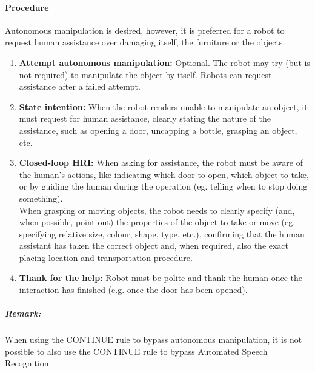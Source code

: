\paragraph{Procedure}
Autonomous manipulation is desired, however, it is preferred for a robot to request human assistance over damaging itself, the furniture or the objects.
\begin{enumerate}
	\item \textbf{Attempt autonomous manipulation:} Optional. The robot may try (but is not required) to manipulate the object by itself. Robots can request assistance after a failed attempt.

	\item \textbf{State intention:} When the robot renders unable to manipulate an object, it must request for human assistance, clearly stating the nature of the assistance, such as opening a door, uncapping a bottle, grasping an object, etc.

	\item \textbf{Closed-loop HRI:} When asking for assistance, the robot must be aware of the human's actions, like indicating which door to open, which object to take, or by guiding the human during the operation (eg. telling when to stop doing something).\\

	When grasping or moving objects, the robot needs to clearly specify (and, when possible, point out) the properties of the object to take or move (eg. specifying relative size, colour, shape, type, etc.), confirming that the human assistant has taken the correct object and, when required, also the exact placing location and transportation procedure.

	\item \textbf{Thank for the help:} Robot must be polite and thank the human once the interaction has finished (e.g. once the door has been opened).
\end{enumerate}

\subparagraph{Remark:} When using the CONTINUE rule to bypass autonomous manipulation, it is not possible to also use the CONTINUE rule to bypass Automated Speech Recognition.

